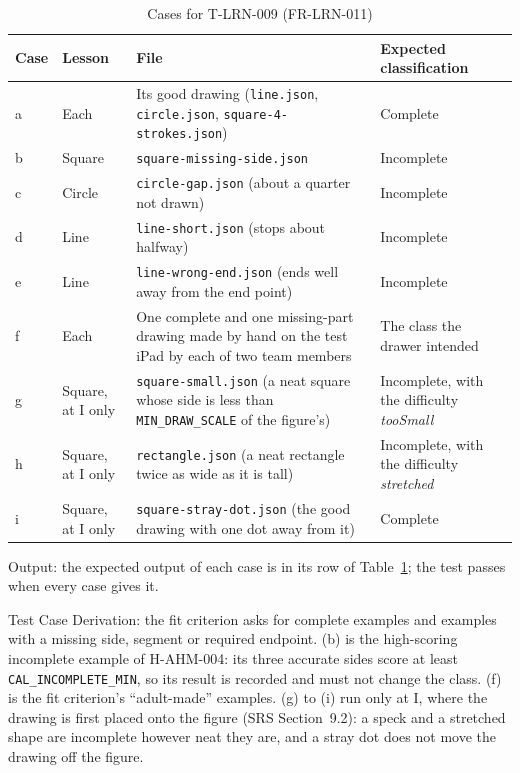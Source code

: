 \documentclass[12pt, titlepage]{article}
\begin{document}
\begin{enumerate}
\begin{table}[htbp]
\centering\small
\caption{Cases for T-LRN-009 (FR-LRN-011)}
\label{tab:t-lrn-009}
\begin{tabularx}{\textwidth}{@{}l l >{\raggedright\arraybackslash}X
  >{\raggedright\arraybackslash}X@{}}
\toprule
\textbf{Case} & \textbf{Lesson} & \textbf{File} &
\textbf{Expected classification}\\
\midrule
a & Each & Its good drawing (\texttt{line.json}, \texttt{circle.json},
\texttt{square-\allowbreak{}4-\allowbreak{}strokes.json}) & Complete\\
b & Square & \texttt{square-\allowbreak{}missing-\allowbreak{}side.json} &
Incomplete\\
c & Circle & \texttt{circle-\allowbreak{}gap.json} (about a quarter not
drawn) & Incomplete\\
d & Line & \texttt{line-\allowbreak{}short.json} (stops about halfway) &
Incomplete\\
e & Line & \texttt{line-\allowbreak{}wrong-\allowbreak{}end.json} (ends
well away from the end point) & Incomplete\\
f & Each & One complete and one missing-part drawing made by hand on the
test iPad by each of two team members & The class the drawer intended\\
g & Square, at I only & \texttt{square-\allowbreak{}small.json} (a neat
square whose side is less than \texttt{MIN\_DRAW\_SCALE} of the figure's) &
Incomplete, with the difficulty \emph{tooSmall}\\
h & Square, at I only & \texttt{rectangle.json} (a neat rectangle twice as
wide as it is tall) & Incomplete, with the difficulty \emph{stretched}\\
i & Square, at I only & \texttt{square-\allowbreak{}stray-\allowbreak{}dot.json}
(the good drawing with one dot away from it) & Complete\\
\bottomrule
\end{tabularx}
\end{table}

Output: the expected output of each case is in its row of
Table~\ref{tab:t-lrn-009}; the test passes when every case gives it.

Test Case Derivation: the fit criterion asks for complete examples and
examples with a missing side, segment or required endpoint. (b) is the
high-scoring incomplete example of H-AHM-004: its three accurate sides
score at least \texttt{CAL\_INCOMPLETE\_MIN}, so its result is recorded
and must not change the class. (f) is the fit criterion's ``adult-made''
examples. (g) to (i) run only at I, where the drawing is first placed onto the
figure (SRS Section~9.2): a speck and a stretched shape are incomplete however
neat they are, and a stray dot does not move the drawing off the figure.


\end{enumerate}
\end{document}
